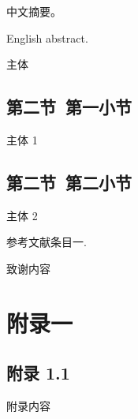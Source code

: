 \documentclass{njubachelor}
\begin{document}
\makectitlepage

\begin{cabstract}
中文摘要。
\end{cabstract}

\begin{eabstract}
English abstract.
\end{eabstract}

\thispagestyle{plain} %
\vspace*{0em}
\maketoc

\newpage
{}

\thispagestyle{plain} %






主体

\subsection{第二节~第一小节}

主体 1

\subsection{第二节~第二小节}

主体 2


\newpage
{}

\begin{thebibliography}{99}
 参考文献条目一.
\end{thebibliography}

\newpage
\ack

致谢内容

\newpage
\appendix

\section{附录一}

\subsection{附录 1.1}

附录内容
\end{document}
